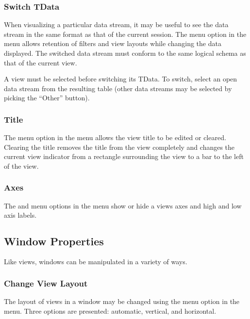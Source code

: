 \subsubsection{Switch TData}

When visualizing a particular data stream, it may be useful to see the data
stream in the same format as that of the current session. The  menu option in the  menu allows retention of filters and
view layouts while changing the data displayed. The switched data stream must
conform to the same logical schema as that of the current view.

A view must be selected before switching its TData. To switch, select an open
data stream from the resulting table (other data streams may be selected by
picking the ``Other'' button).

\subsubsection{Title}

The  menu option in the  menu allows the view title to be
edited or cleared. Clearing the title removes the title from the view completely
and changes the current view indicator from a rectangle surrounding the view to
a bar to the left of the view.

\subsubsection{Axes}

The  and  menu options in the
 menu show or hide a views axes and high and low axis labels.


\subsection{Window Properties}

Like views, windows can be manipulated in a variety of ways.

\subsubsection{Change View Layout}

The layout of views in a window may be changed using the  menu
option in the  menu. Three options are presented: automatic,
vertical, and horizontal.

